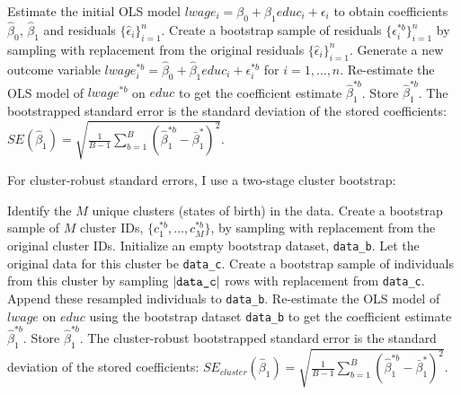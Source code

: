 \documentclass[12pt]{article}
\begin{document}
\begin{algorithm}[H]
    \caption{Parametric Bootstrap for OLS Standard Errors}
    \label{alg:parametric_bootstrap}
    \begin{algorithmic}[1]
        \State Estimate the initial OLS model $lwage_i = \beta_0 + \beta_1 educ_i + \epsilon_i$ to obtain coefficients $\hat{\beta}_0$, $\hat{\beta}_1$ and residuals $\{\hat{\epsilon}_i\}_{i=1}^n$.
            \State Create a bootstrap sample of residuals $\{\epsilon_i^{*b}\}_{i=1}^n$ by sampling with replacement from the original residuals $\{\hat{\epsilon}_i\}_{i=1}^n$.
            \State Generate a new outcome variable $lwage_i^{*b} = \hat{\beta}_0 + \hat{\beta}_1 educ_i + \epsilon_i^{*b}$ for $i=1, \dots, n$.
            \State Re-estimate the OLS model of $lwage^{*b}$ on $educ$ to get the coefficient estimate $\hat{\beta}_1^{*b}$.
            \State Store $\hat{\beta}_1^{*b}$.
        \EndFor
        \State The bootstrapped standard error is the standard deviation of the stored coefficients: $SE(\hat{\beta}_1) = \sqrt{\frac{1}{B-1}\sum_{b=1}^B (\hat{\beta}_1^{*b} - \bar{\beta}_1^*)^2}$.
    \end{algorithmic}
\end{algorithm}

For cluster-robust standard errors, I use a two-stage cluster bootstrap:
\begin{algorithm}[H]
    \caption{Cluster-Robust Bootstrap (Two-Stage Resampling)}
    \label{alg:cluster_bootstrap}
    \begin{algorithmic}[1]
        \State Identify the $M$ unique clusters (states of birth) in the data.
            \State Create a bootstrap sample of $M$ cluster IDs, $\{c_1^{*b}, \dots, c_M^{*b}\}$, by sampling with replacement from the original cluster IDs.
            \State Initialize an empty bootstrap dataset, \texttt{data\_b}.
                \State Let the original data for this cluster be \texttt{data\_c}.
                \State Create a bootstrap sample of individuals from this cluster by sampling $|\text{\texttt{data\_c}}|$ rows with replacement from \texttt{data\_c}.
                \State Append these resampled individuals to \texttt{data\_b}.
            \EndFor
            \State Re-estimate the OLS model of $lwage$ on $educ$ using the bootstrap dataset \texttt{data\_b} to get the coefficient estimate $\hat{\beta}_1^{*b}$.
            \State Store $\hat{\beta}_1^{*b}$.
        \EndFor
        \State The cluster-robust bootstrapped standard error is the standard deviation of the stored coefficients: $SE_{cluster}(\hat{\beta}_1) = \sqrt{\frac{1}{B-1}\sum_{b=1}^B (\hat{\beta}_1^{*b} - \bar{\beta}_1^*)^2}$.
    \end{algorithmic}
\end{algorithm}
\end{document}

